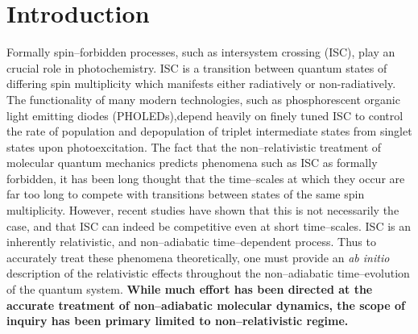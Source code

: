 \section{Introduction}

Formally spin--forbidden processes, such as intersystem crossing (ISC),  play an
crucial role in photochemistry.\cite{Marian_SOC,Scaiano_Photo,Steer93_CR67} ISC
is a transition between quantum states of differing spin multiplicity which
manifests either radiatively or non-radiatively.  The functionality of many
modern technologies, such as phosphorescent organic light emitting diodes
(PHOLEDs)\cite{Miyaguchi99_JAP1502},depend heavily on finely tuned ISC to
control the rate of population and depopulation of triplet intermediate states
from singlet states upon photoexcitation. The fact that the non--relativistic
treatment of molecular quantum mechanics predicts phenomena such as ISC as
formally forbidden, it has been long thought that the time--scales at which they
occur are far too long to compete with transitions between states of the same
spin multiplicity. However, recent studies have shown that this is not
necessarily the case, and that ISC can indeed be competitive even at short
time--scales.\cite{Marian_SOC,Li16_JA2}  ISC is an inherently relativistic, and
non--adiabatic time--dependent process\cite{Dyall07_book,Reiher15_book}.  Thus
to accurately treat these phenomena theoretically, one must provide an \emph{ab
initio} description of the relativistic effects throughout the non--adiabatic
time--evolution of the quantum system.  {\bf While much effort has been directed
at the accurate treatment of non--adiabatic molecular dynamics, the scope of
inquiry has been primary limited to non--relativistic regime.}

